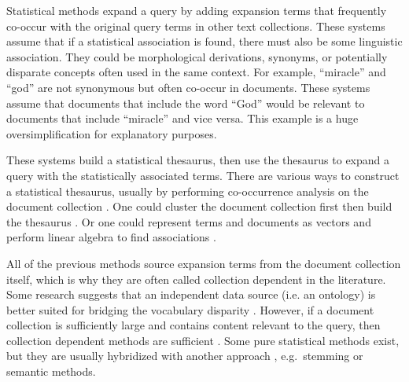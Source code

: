 Statistical methods expand a query by adding expansion terms that frequently co-occur with the original query terms in other text collections. These systems assume that if a statistical association is found, there must also be some linguistic association. They could be morphological derivations, synonyms, or potentially disparate concepts often used in the same context. For example, ``miracle'' and ``god'' are not synonymous but often co-occur in documents. These systems assume that documents that include the word ``God'' would be relevant to documents that include ``miracle'' and vice versa. This example is a huge oversimplification for explanatory purposes. 

These systems build a statistical thesaurus, then use the thesaurus to expand a query with the statistically associated terms. There are various ways to construct a statistical thesaurus, usually by performing co-occurrence analysis on the document collection \cite{jing1994association}. One could cluster the document collection first then build the thesaurus \cite{crouch1992experiments}. Or one could represent terms and documents as vectors and perform linear algebra to find associations \cite{qiu1993concept}. 

All of the previous methods source expansion terms from the document collection itself, which is why they are often called collection dependent in the literature. Some research suggests that an independent data source (i.e. an ontology) is better suited for bridging the vocabulary disparity \cite{biswas1986knowledge}. However, if a document collection is sufficiently large and contains content relevant to the query, then collection dependent methods are sufficient \cite{bhogal2007review}. Some pure statistical methods exist, but they are usually hybridized with another approach \cite{raza2019survey}, e.g.\ stemming or semantic methods.







